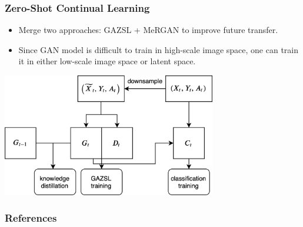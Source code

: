 \documentclass[10pt]{beamer}
\begin{document}
\begin{frame}
    \frametitle{Zero-Shot Continual Learning}
    \begin{itemize}
        \item Merge two approaches: GAZSL + MeRGAN to improve future transfer.
        \item Since GAN model is difficult to train in high-scale image space, one can train it in either low-scale image space or latent space.
    \end{itemize}
    \vspace{0.5cm}
    \centering
    \includegraphics[width=0.7\textwidth]{images/latent-genmem}
\end{frame}

%    
%    

\begin{frame}
    \frametitle{References}
    \printbibliography[heading=none]
\end{frame}
\end{document}
